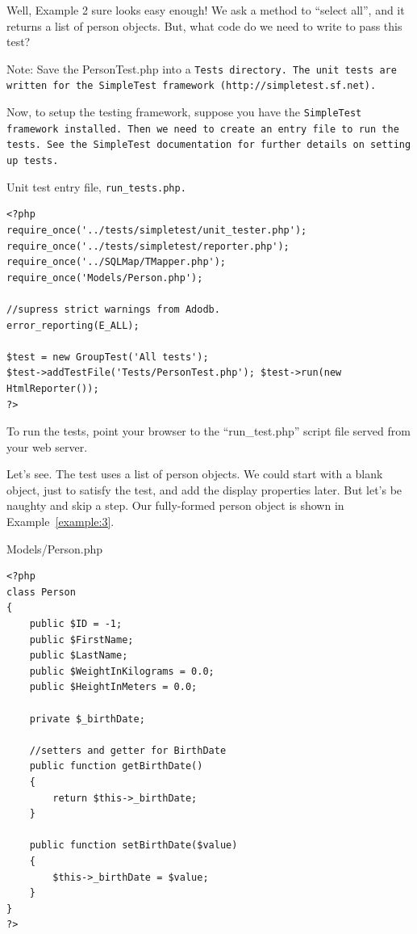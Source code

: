 Well, Example 2 sure looks easy enough! We ask a method to ``select all'', and
it returns a list of person objects. But, what code do we need to write to
pass this test?

\begin{mybox}{Note:}
    Save the PersonTest.php into a \tt{Tests} directory. The unit tests are
    written for the SimpleTest framework (http://simpletest.sf.net).
\end{mybox}

Now, to setup the testing framework, suppose you have the \tt{SimpleTest}
framework installed. Then we need to create an entry file to run the tests.
See the \tt{SimpleTest} documentation for further details on setting up tests.

\begin{example}\label{example:2a}
Unit test entry file, \tt{run\_tests.php}.
\begin{verbatim}
<?php
require_once('../tests/simpletest/unit_tester.php');
require_once('../tests/simpletest/reporter.php');
require_once('../SQLMap/TMapper.php');
require_once('Models/Person.php');

//supress strict warnings from Adodb.
error_reporting(E_ALL);

$test = new GroupTest('All tests');
$test->addTestFile('Tests/PersonTest.php'); $test->run(new HtmlReporter());
?>
\end{verbatim}
\end{example}
To run the tests, point your browser to the ``run\_test.php'' script file
served from your web server.

Let's see. The test uses a list of person objects. We could start with a blank
object, just to satisfy the test, and add the display properties later. But
let's be naughty and skip a step. Our fully-formed person object is shown in
Example~\ref{example:3}.

\begin{example}\label{example:3}
Models/Person.php
\begin{verbatim}
<?php
class Person
{
    public $ID = -1;
    public $FirstName;
    public $LastName;
    public $WeightInKilograms = 0.0;
    public $HeightInMeters = 0.0;

    private $_birthDate;

    //setters and getter for BirthDate
    public function getBirthDate()
    {
        return $this->_birthDate;
    }

    public function setBirthDate($value)
    {
        $this->_birthDate = $value;
    }
}
?>
\end{verbatim}
\end{example}

